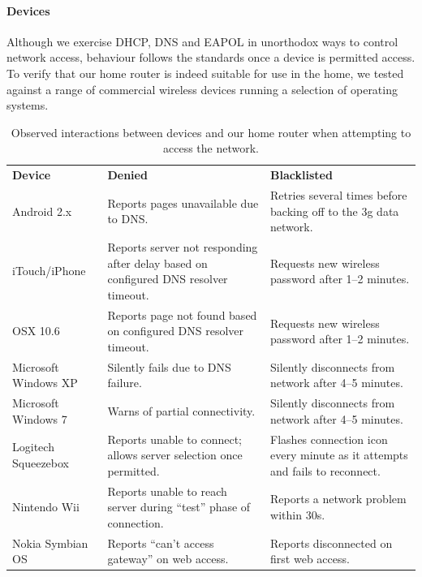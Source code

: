 \paragraph{Devices} Although we exercise DHCP, DNS and EAPOL in unorthodox ways
to control network access, behaviour follows the standards once a device is
permitted access.  To verify that our home router is indeed suitable for use in
the home, we tested against a range of commercial wireless devices running a
selection of operating systems. 

\begin{table} \centering\footnotesize
  \begin{tabular}{lp{}p{}} \bf Device & \bf Denied &
    \bf Blacklisted\\

Android 2.x & Reports pages unavailable due to DNS.  & Retries several times
before backing off to the 3g data network.\\

iTouch/iPhone & Reports server not responding after delay based on configured
DNS resolver timeout.  & Requests new wireless password after 1--2 minutes.\\

OSX 10.6 & Reports page not found based on configured DNS resolver timeout.  &
Requests new wireless password after 1--2 minutes.\\

Microsoft Windows XP & Silently fails due to DNS failure.  & Silently
disconnects from network after 4--5 minutes.\\

Microsoft Windows 7 & Warns of partial connectivity.  & Silently disconnects
from network after 4--5 minutes.\\

Logitech Squeezebox & Reports unable to connect; allows server selection once
permitted.  & Flashes connection icon every minute as it attempts and fails to
reconnect.  \\ 

Nintendo Wii & Reports unable to reach server during ``test'' phase of
connection.  & Reports a network problem within 30s.\\

Nokia Symbian OS & Reports ``can't access gateway'' on web access.  & Reports
disconnected on first web access.\\ \end{tabular}
\caption{\label{t:devices}Observed interactions between devices and our home
  router when attempting to access the network.}
\end{table}

